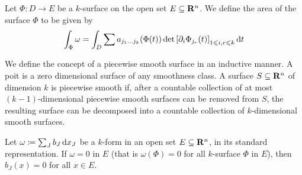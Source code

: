 \begin{definition}
\label{def:k-surface-area}
Let \(\Phi: D \to E\) be a \(k\)-surface on the open set \(E \subseteq
\mathbf{R}^n\). We define the area of the surface \(\Phi\) to be given by
\[
  \int_{\Phi} \omega
  = \int_D \sum a_{j_1 \dots j_k}(\Phi(t))
  \det {\left[ \partial_i \Phi_{j_r}(t) \right]}_{1 \leqslant i, r \leqslant k}
  \, \mathrm{d} t
\]
\end{definition}

\begin{definition}
\label{def:piecewise-smooth-surface}
We define the concept of a piecewise smooth surface in an inductive manner. A
poit is a zero dimensional surface of any smoothness class. A surface \(S
\subseteq \mathbf{R}^n\) of dimension \(k\) is piecewise smooth if, after a countable
collection of at most \((k-1)\)-dimensional piecewise smooth surfaces can be
removed from \(S\), the resulting surface can be decomposed into a countable
collection of \(k\)-dimensional smooth surfaces.
\end{definition}

\begin{theorem}
\label{thm:zero-form-standard-representation}
Let \(\omega \coloneq \sum_J b_J\, \mathrm{d} x_J\) be a \(k\)-form in an open set
\(E \subseteq \mathbf{R}^{n}\), in its standard representation. If \(\omega = 0\) in
\(E\) (that is \(\omega(\Phi) = 0\) for all \(k\)-surface \(\Phi\) in \(E\)),
then \(b_J(x) = 0\) for all \(x \in E\).
\end{theorem}

